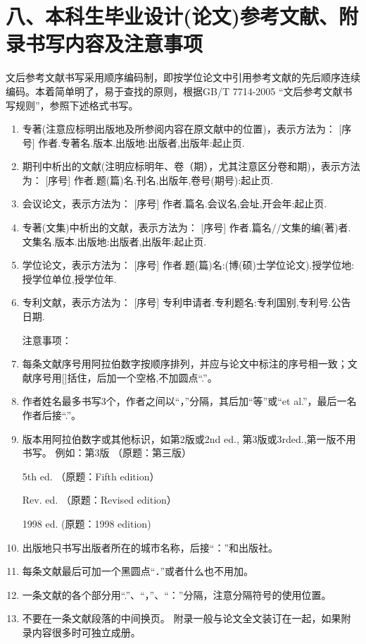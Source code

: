 \documentclass{cupb-thesis}
\begin{document}
\section{八、本科生毕业设计(论文)参考文献、附录书写内容及注意事项}

文后参考文献书写采用顺序编码制，即按学位论文中引用参考文献的先后顺序连续编码。本着简单明了，易于查找的原则，根据GB/T 7714-2005 “文后参考文献书写规则”，参照下述格式书写。

\begin{enumerate}[label=\arabic*.]
  \item 专著(注意应标明出版地及所参阅内容在原文献中的位置)，表示方法为：
[序号] 作者.专著名.版本.出版地:出版者,出版年:起止页.

  \item 期刊中析出的文献(注明应标明年、卷（期），尤其注意区分卷和期)，表示方法为：
[序号] 作者.题(篇)名.刊名,出版年,卷号(期号):起止页.

  \item 会议论文，表示方法为：
[序号] 作者.篇名.会议名,会址,开会年:起止页.

  \item 专著(文集)中析出的文献，表示方法为：
[序号] 作者.篇名//文集的编(著)者.文集名.版本.出版地:出版者,出版年:起止页.

  \item 学位论文，表示方法为：
[序号] 作者.题(篇)名:(博(硕)士学位论文).授学位地:授学位单位,授学位年.

  \item 专利文献，表示方法为：
[序号] 专利申请者.专利题名:专利国别,专利号.公告日期.

注意事项：

  \item 每条文献序号用阿拉伯数字按顺序排列，并应与论文中标注的序号相一致；文献序号用[]括住，后加一个空格,不加圆点“.”。
  \item 作者姓名最多书写3个，作者之间以“，”分隔，其后加“等”或“et al.”，最后一名作者后接“.”。
  \item 版本用阿拉伯数字或其他标识，如第2版或2nd ed., 第3版或3rded.,第一版不用书写。
例如：第3版  （原题：第三版）

5th ed.  （原题：Fifth edition）

Rev. ed. （原题：Revised edition）

1998 ed.  (原题：1998 edition)

  \item 出版地只书写出版者所在的城市名称，后接“：”和出版社。
  \item 每条文献最后可加一个黑圆点“．”或者什么也不用加。
  \item 一条文献的各个部分用“.”、“，”、“：”分隔，注意分隔符号的使用位置。
  \item 不要在一条文献段落的中间换页。
附录一般与论文全文装订在一起，如果附录内容很多时可独立成册。

\end{enumerate}
\end{document}
